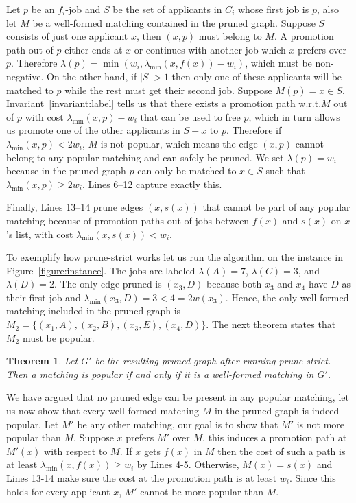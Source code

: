 \documentclass[11pt]{article}
\newcommand{\first}{f}
\newcommand{\second}{s}
\newcommand{\minlabel}{\ensuremath{\lambda_{\mathrm{min}}}}
\newcommand{\lab}{\ensuremath{\lambda}}
\newcommand{\wrt}{{w.r.t.}\xspace}
\newtheorem{theorem}{Theorem}
\begin{document}
Let $p$ be an $\first_i$-job and $S$ be the set of applicants in $C_i$ whose first job is $p$, also let $M$ be a well-formed matching contained in the pruned graph. Suppose $S$ consists of just one applicant $x$, then $(x,p)$ must belong to $M$. A promotion path out of $p$ either ends at $x$ or continues with another job which $x$ prefers over $p$. Therefore $\lab(p) =\min (w_i, \minlabel(x, \first(x) )-w_i) $, which must be non-negative. On the other hand, if $|S|>1$ then only one of these applicants will be matched to $p$ while the rest must get their second job. Suppose $M(p) = x \in S$. Invariant~\ref{invariant:label} tells us that there exists a promotion path \wrt $M$ out of $p$ with cost $\minlabel(x,p) - w_i$ that can be used to free $p$, which in turn allows us promote one of the other applicants in $S - x$ to $p$. Therefore if $\minlabel(x,p) < 2w_i$, $M$ is not popular, which means the edge $(x, p)$ cannot belong to any popular matching and can safely be pruned. We set $\lab(p) = w_i$ because in the pruned graph $p$ can only be matched to $x \in S$ such that $\minlabel(x,p) \geq 2w_i$. Lines 6--12 capture exactly this.

Finally, Lines 13--14 prune edges $(x,\second(x))$ that cannot be part of any popular matching because of promotion paths out of jobs between $\first(x)$ and $\second(x)$ on $x$'s list, with cost $\minlabel(x,\second(x)) < w_i$.

To exemplify how {\sc prune-strict} works let us run the algorithm on the instance in Figure~\ref{figure:instance}. The jobs are labeled $\lab(A) = 7$, $\lab(C) = 3$, and $\lab(D) =2$. The only edge pruned is $(x_3, D)$ because both $x_3$ and $x_4$ have $D$ as their first job and $\minlabel(x_3, D) = 3 < 4 = 2 w(x_3)$. Hence, the only well-formed matching included in the pruned graph is $M_2 = \{ (x_1,A), (x_2,B), (x_3,E),(x_4,D)\}$. The next theorem states that $M_2$ must be popular.

\begin{theorem} Let $G'$ be the resulting pruned graph after running {\sc prune-strict}. Then a matching is popular if and only if it is a well-formed matching in $G'$.
\end{theorem}

We have argued that no pruned edge can be present in any popular matching, let us now show that every well-formed matching $M$ in the pruned graph is indeed popular. Let $M'$ be any other matching, our goal is to show that $M'$ is not more popular than $M$. Suppose $x$ prefers $M'$ over $M$, this induces a promotion path at $M'(x)$ with respect to $M$. If $x$ gets $f(x)$ in $M$ then the cost of such a path is at least $\minlabel(x, \first(x)) \geq w_i$ by Lines 4-5. Otherwise, $M(x)=\second(x)$ and Lines 13-14 make sure the cost at the promotion path is at least $w_i$. Since this holds for every applicant $x$, $M'$ cannot be more popular than $M$. 
\end{document}
